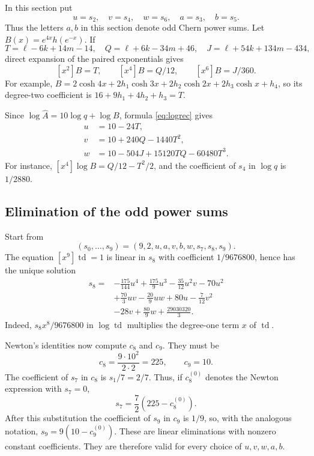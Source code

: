 \documentclass[11pt,reqno,letterpaper]{amsart}
\newcommand{\td}{\operatorname{td}}
\newcommand{\Ahat}{\widehat A}
\theoremstyle{definition}
\numberwithin{equation}{section}
\begin{document}
In this section put
\[
 u=s_2,\quad v=s_4,\quad w=s_6,\quad a=s_3,\quad b=s_5.
\]
Thus the letters $a,b$ in this section denote odd Chern power sums. Let $B(x)=e^{4x}h(e^{-x})$. If
\[
 T=\ell-6k+14m-14,\quad Q=\ell+6k-34m+46,\quad
 J=\ell+54k+134m-434,
\]
direct expansion of the paired exponentials gives
\[
 [x^2]B=T,\qquad [x^4]B=Q/12,\qquad [x^6]B=J/360.
\]
For example, $B=2\cosh4x+2h_1\cosh3x+2h_2\cosh2x
+2h_3\cosh x+h_4$, so its degree-two coefficient is
$16+9h_1+4h_2+h_3=T$.

Since $\log\Ahat=10\log q+\log B$, formula \eqref{eq:logrec} gives
\begin{equation}\label{eq:C9powers}
\begin{aligned}
 u&=10-24T,\\
 v&=10+240Q-1440T^2,\\
 w&=10-504J+15120TQ-60480T^3.
\end{aligned}
\end{equation}
For instance, $[x^4]\log B=Q/12-T^2/2$, and the coefficient of
$s_4$ in $\log q$ is $1/2880$.

\subsection{Elimination of the odd power sums}
Start from
\[
 (s_0,\ldots,s_9)=(9,2,u,a,v,b,w,s_7,s_8,s_9).
\]
The equation $[x^9]\td=1$ is linear in $s_8$ with coefficient
$1/9676800$, hence has the unique solution
\begin{equation}\label{eq:s8nine}
\begin{aligned}
s_8={}&-\frac{175}{144}u^4+\frac{175}{9}u^3-\frac{35}{12}u^2v-70u^2\\
 &+\frac{70}{3}uv-\frac{20}{9}uw+80u-\frac7{12}v^2\\
 &-28v+\frac{80}{9}w+\frac{29030320}{3}.
\end{aligned}
\end{equation}
Indeed, $s_8x^8/9676800$
in $\log\td$ multiplies the degree-one term $x$ of $\td$.

Newton's identities now compute $c_8$ and $c_9$. They must be
\[
 c_8=\frac{9\cdot10^2}{2\cdot2}=225,\qquad c_9=10.
\]
The coefficient of $s_7$ in $c_8$ is $s_1/7=2/7$.
Thus, if $c_8^{(0)}$ denotes the Newton expression with $s_7=0$,
\[
 s_7=\frac72(225-c_8^{(0)}).
\]
After this substitution the coefficient of $s_9$ in $c_9$ is $1/9$,
so, with the analogous notation, $s_9=9(10-c_9^{(0)})$.
These are linear eliminations with nonzero constant coefficients.
They are therefore valid for every choice of $u,v,w,a,b$.
\end{document}

